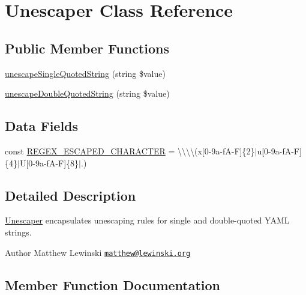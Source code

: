 \hypertarget{class_symfony_1_1_component_1_1_yaml_1_1_unescaper}{}\section{Unescaper Class Reference}
\label{class_symfony_1_1_component_1_1_yaml_1_1_unescaper}
\subsection*{Public Member Functions}
\begin{DoxyCompactItemize}
\item 
\mbox{\hyperlink{class_symfony_1_1_component_1_1_yaml_1_1_unescaper_a2a881a3d1cb8448f933f7e2809bd2396}{unescape\+Single\+Quoted\+String}} (string \$value)
\item 
\mbox{\hyperlink{class_symfony_1_1_component_1_1_yaml_1_1_unescaper_a9d55b72557892de026ac0ccd5f46a465}{unescape\+Double\+Quoted\+String}} (string \$value)
\end{DoxyCompactItemize}
\subsection*{Data Fields}
\begin{DoxyCompactItemize}
\item 
const \mbox{\hyperlink{class_symfony_1_1_component_1_1_yaml_1_1_unescaper_a5356e3ed7b9c99d134587dc04ca30e45}{R\+E\+G\+E\+X\+\_\+\+E\+S\+C\+A\+P\+E\+D\+\_\+\+C\+H\+A\+R\+A\+C\+T\+ER}} = \textquotesingle{}\textbackslash{}\textbackslash{}\textbackslash{}\textbackslash{}(x\mbox{[}0-\/9a-\/f\+A-\/\+F\mbox{]}\{2\}$\vert$u\mbox{[}0-\/9a-\/f\+A-\/\+F\mbox{]}\{4\}$\vert$\+U\mbox{[}0-\/9a-\/f\+A-\/\+F\mbox{]}\{8\}$\vert$.)\textquotesingle{}
\end{DoxyCompactItemize}


\subsection{Detailed Description}
\mbox{\hyperlink{class_symfony_1_1_component_1_1_yaml_1_1_unescaper}{Unescaper}} encapsulates unescaping rules for single and double-\/quoted Y\+A\+ML strings.

\begin{DoxyAuthor}{Author}
Matthew Lewinski \href{mailto:matthew@lewinski.org}{\tt matthew@lewinski.\+org} 
\end{DoxyAuthor}


\subsection{Member Function Documentation}
\mbox{\label{class_symfony_1_1_component_1_1_yaml_1_1_unescaper_a9d55b72557892de026ac0ccd5f46a465}} 
